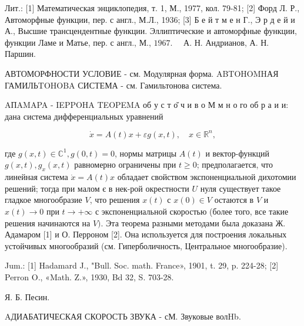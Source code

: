 \documentclass[10pt]{article}
\begin{document}
Лит.: [1] Математическая энциклопедия, т. 1, М., 1977, кол. 79-81; [2] Форд Л. Р., Автоморфные функции, пер. с англ., М.Л., 1936; [3] Б е й т м е н Г., Э р д е й и А., Высшие трансцендентные функции. Эллиптические и автоморфные функции, функции Ламе и Матье, пер. с англ., М., $1967 . \quad$ А. Н. Андрианов, А. Н. Паршин.



АВТОМОРФНОСТИ УСЛОВИЕ - см. Модулярная форма. ABTOHOMHАЯ ГАМИЛЬTOHOBA СИСТЕМА - см. Гамильтонова система.



AПAMAPA - IEPPOHA TEOPEMA об у с т о̆ ч и в о М м н о го об р а и и: дана система дифференциальных уравнений



\[

\dot{x}=A(t) x+\varepsilon g(x, t), \quad x \in \mathbb{R}^{n},

\]



где $g(x, t) \in \mathbb{C}^{1}, g(0, t)=0$, нормы матрицы $A(t)$ и вектор-функций $g(x, t), g_{x}(x, t)$ равномерно ограничены при $t \geqslant 0$; предполагается, что линейная система $\dot{x}=A(t) x$ обладает свойством экспоненциальной дихотомии решений; тогда при малом є в нек-рой окрестности $U$ нуля существует такое гладкое многообразие $V$, что решения $x(t)$ с $x(0) \in V$ остаются в $V$ и $x(t) \rightarrow 0$ при $t \rightarrow+\infty$ с экспоненциальной скоростью (более того, все такие решения начинаются на $V)$. Эта теорема разными методами была доказана Ж. Адамаром [1] и О. Перроном [2]. Она используется для построения локальных устойчивых многообразий (см. Гиперболичность, Центральное многообразие).



Jum.: [1] Hadamard J., "Bull. Soc. math. France», 1901, t. 29, p. 224-28; [2] Perron O., «Math. Z.», 1930, Bd 32, S. 703-28.



Я. Б. Песин.



AДИАБАТИЧЕСКАЯ СКОРОСТЬ ЗВУКА - сМ. Звуковые волHb.
\end{document}
